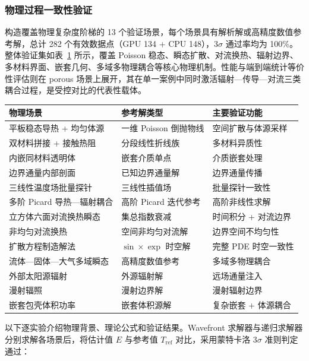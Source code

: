 \subsubsection{物理过程一致性验证}

构造覆盖物理复杂度阶梯的 13 个验证场景，每个场景具有解析解或高精度数值参考解，总计 282 个有效数据点（GPU 134 + CPU 148），$3\sigma$ 通过率均为 100\%。整体验证集如表~\ref{tab:consistency-suite} 所示，覆盖 Poisson 稳态、瞬态扩散、对流换热、辐射边界、多材料界面、嵌套几何、多域多物理耦合等核心物理机制。性能与端到端统计等价性评估则在 porous 场景上展开，其在单一案例中同时激活辐射—传导—对流三类耦合过程，是受控对比的代表性载体。

\begin{table}[htbp]
  \centering
  \label{tab:consistency-suite}
  \small
  \begin{tabular}{lll}
    \toprule
    物理场景 & 参考解类型 & 主要验证功能 \\
    \midrule
    平板稳态导热 + 均匀体源 & 一维 Poisson 倒抛物线 & 空间扩散与体源采样 \\
    双材料拼接 + 接触热阻 & 分段线性折线族 & 多材料异质性 \\
    内嵌同材料透明体 & 嵌套介质单点 & 介质嵌套处理 \\
    边界通量内部剖面 & 已知边界通量解 & 边界通量传播 \\
    三线性温度场批量探针 & 三线性插值场 & 批量探针一致性 \\
    多阶 Picard 导热—辐射耦合 & 高阶 Picard 迭代参考 & 高阶非线性求解 \\
    立方体六面对流换热瞬态 & 集总指数衰减 & 时间积分 + 对流边界 \\
    非均匀对流换热 & 空间非均匀对流解 & 边界空间不均匀性 \\
    扩散方程制造解法 & $\sin\!\times\!\exp$ 时空解 & 完整 PDE 时空一致性 \\
    流体—固体—大气多域瞬态 & 高精度数值参考 & 多域多物理耦合 \\
    外部太阳源辐射 & 外源辐射解 & 远场通量注入 \\
    漫射辐照 & 漫射边界解 & 漫射辐射边界 \\
    嵌套包壳体积功率 & 嵌套体积源解 & 复杂嵌套 + 体源耦合 \\
    \bottomrule
  \end{tabular}
\end{table}

以下逐实验介绍物理背景、理论公式和验证结果。Wavefront 求解器与递归求解器分别求解各场景后，将估计值 $E$ 与参考值 $T_{\mathrm{ref}}$ 对比，采用蒙特卡洛 $3\sigma$ 准则判定通过：

